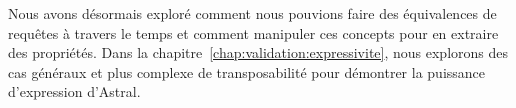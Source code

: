 Nous avons désormais exploré comment nous pouvions faire des équivalences de requêtes à travers le temps et comment manipuler ces concepts pour en extraire des propriétés. Dans la chapitre~\ref{chap:validation:expressivite}, nous explorons des cas généraux et plus complexe de transposabilité pour démontrer la puissance d'expression d'Astral.
